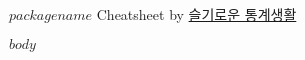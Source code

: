 \documentclass[10pt,quotespacing]{oblivoir}
\begin{document}
\textbf{$packagename$} Cheatsheet by \href{https://www.youtube.com/c/statisticsplaybook}{슬기로운 통계생활}

\begin{multicols*}{4}

\setlength{\premulticols}{0.25pt}
\setlength{\postmulticols}{0.25pt}
\setlength{\multicolsep}{0.25pt}
\setlength{\columnsep}{0.25pt}

\tiny

$body$

\end{multicols*}
\end{document}
